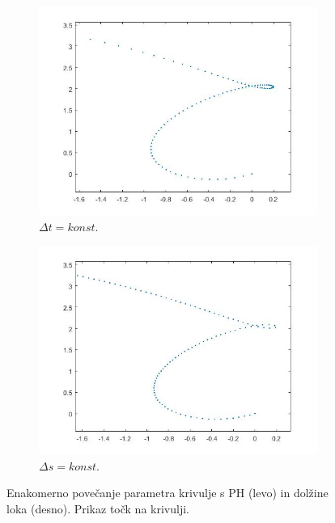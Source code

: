 \documentclass[a4paper]{article}
\begin{document}
	\begin{figure}[h]
		\centering
		\begin{subfigure}{.5\textwidth}
			\centering
			\includegraphics[width=\linewidth]{konstDt.jpg}
			\caption{$\Delta t=konst.$}
			\label{fig:constDt}
		\end{subfigure}%
		\begin{subfigure}{.5\textwidth}
			\centering
			\includegraphics[width=\linewidth]{konstDs.jpg}
			\caption{$\Delta s=konst.$}
			\label{fig:constDs}
		\end{subfigure}
		\caption{Enakomerno povečanje parametra krivulje s PH (levo) in dolžine loka (desno). Prikaz točk na krivulji.}
		\label{fig:constD}
	\end{figure}
	
\end{document}
